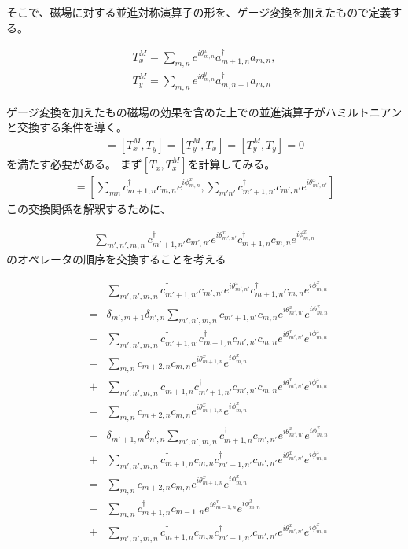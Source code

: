 \documentclass{article}
\begin{document}
そこで、磁場に対する並進対称演算子の形を、ゲージ変換を加えたもので定義する。

\begin{eqnarray}
T_x^M=\sum_{m,n} e^{i\theta_{m,n}^x}a_{m+1,n}^\dagger
a_{m,n}, \nonumber \\
T_y^M=\sum_{m,n}e^{i\theta_{m,n}^y}a_{m,n+1}^\dagger
a_{m,n} 
\end{eqnarray}

ゲージ変換を加えたもの磁場の効果を含めた上での並進演算子がハミルトニアンと交換する条件を導く。
\begin{eqnarray}
[T_x,T_x^M]=[T_x^M, T_y]=[T_y^M, T_x]=[T_y^M, T_y]=0
\end{eqnarray}
を満たす必要がある。
まず$[T_x,T_x^M]$を計算してみる。
\begin{eqnarray}
[T_x,T_x^M]=[\sum_{mn}c_{m+1,n}^\dagger c_{m,n}e^{i\phi_{m,n}^x},
\sum_{m'n'}c_{m'+1,n'}^\dagger c_{m',n'}e^{i\theta_{m',n'}^x}]
\end{eqnarray}
この交換関係を解釈するために、

\begin{eqnarray}
\sum_{m',n', m,n}c_{m'+1,n'}^\dagger
c_{m',n'}e^{i\theta_{m',n'}^x}c_{m+1,n}^\dagger c_{m,n}e^{i\phi_{m,n}^x}
\end{eqnarray}
のオペレータの順序を交換することを考える

\begin{eqnarray}
&&\sum_{m',n', m,n}c_{m'+1,n'}^\dagger
c_{m',n'}e^{i\theta_{m',n'}^x}c_{m+1,n}^\dagger c_{m,n}e^{i\phi_{m,n}^x}
\nonumber \\
&=&\delta_{m',m+1}\delta_{n',n} \sum_{m',n', m,n} c_{m'+1, n'} c_{m,n}
e^{i\theta_{m',n'}^x} e^{i\phi_{m,n}^x} \nonumber \\
&-&\sum_{m',n',
m,n}c_{m'+1,n'}^\dagger c_{m+1,n}^\dagger
c_{m',n'} c_{m,n} e^{i\theta_{m',n'}^x} e^{i\phi_{m,n}^x} \nonumber \\
&=&\sum_{m,n} c_{m+2, n} c_{m,n}
e^{i\theta_{m+1,n}^x} e^{i\phi_{m,n}^x} \nonumber \\
&+&\sum_{m',n',
m,n} c_{m+1,n}^\dagger c_{m'+1,n'}^\dagger 
c_{m',n'} c_{m,n} e^{i\theta_{m',n'}^x} e^{i\phi_{m,n}^x} \nonumber \\
&=&\sum_{m,n} c_{m+2, n} c_{m,n}
e^{i\theta_{m+1,n}^x} e^{i\phi_{m,n}^x} \nonumber \\
&-& \delta_{m'+1,m} \delta_{n',n} \sum_{m',n',
m,n} c_{m+1,n}^\dagger c_{m',n'} e^{i\theta_{m',n'}^x} e^{i\phi_{m,n}^x}  \nonumber \\
&+& \sum_{m',n',
m,n} c_{m+1,n}^\dagger c_{m,n} c_{m'+1,n'}^\dagger 
c_{m',n'} e^{i\theta_{m',n'}^x} e^{i\phi_{m,n}^x} \nonumber \\
&=&\sum_{m,n} c_{m+2, n} c_{m,n}
e^{i\theta_{m+1,n}^x} e^{i\phi_{m,n}^x} \nonumber \\
&-& \sum_{m,n} c_{m+1,n}^\dagger c_{m-1,n} e^{i\theta_{m-1,n}^x}
e^{i\phi_{m,n}^x}  \nonumber \\
&+& \sum_{m',n',
m,n} c_{m+1,n}^\dagger c_{m,n} c_{m'+1,n'}^\dagger 
c_{m',n'} e^{i\theta_{m',n'}^x} e^{i\phi_{m,n}^x} 
\end{eqnarray}
\end{document}
